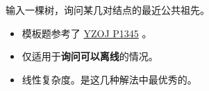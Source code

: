 \noindent 输入一棵树，询问某几对结点的最近公共祖先。

\begin{itemize}
    \item 模板题参考了 \href{https://oiproxy.bugminer.top/OnlineJudge/problem_show.php?id=1345}{YZOJ P1345} 。
    \item 仅适用于\textbf{询问可以离线}的情况。
    \item 线性复杂度。是这几种解法中最优秀的。
\end{itemize}